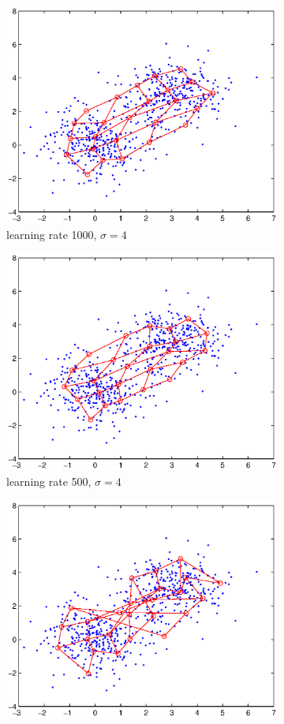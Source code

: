 \documentclass[a4paper,12pt]{article}
\begin{document}
\begin{figure}[h!]
\begin{center}

\begin{subfigure}{.33\textwidth}
  \centering
  \includegraphics[width=.8\linewidth]{p1000}
      \caption{learning rate 1000, $ \sigma = 4 $}
\end{subfigure}%
\begin{subfigure}{.33\textwidth}
  \centering
  \includegraphics[width=.8\linewidth]{p500}
      \caption{learning rate 500, $ \sigma = 4 $}
\end{subfigure}%
\begin{subfigure}{.33\textwidth}
  \centering
  \includegraphics[width=.8\linewidth]{rho1}

\end{subfigure}
\end{center}
\end{figure}
\end{document}
